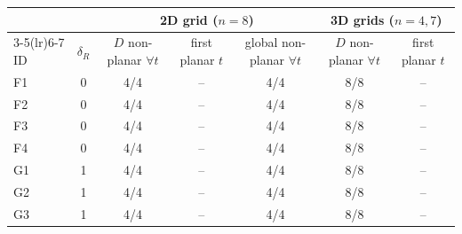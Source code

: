 \begin{tabular}{lcccccc}
\toprule
 & & \multicolumn{3}{c}{2D grid ($n=8$)} & \multicolumn{2}{c}{3D grids ($n=4,7$)}\\
\cmidrule(lr){3-5}\cmidrule(lr){6-7}
ID & $\delta_R$ & $D$ non-planar $\forall t$ & first planar $t$ & global non-planar $\forall t$ & $D$ non-planar $\forall t$ & first planar $t$\\
\midrule
F1 & 0 & 4/4 & -- & 4/4 & 8/8 & --\\
F2 & 0 & 4/4 & -- & 4/4 & 8/8 & --\\
F3 & 0 & 4/4 & -- & 4/4 & 8/8 & --\\
F4 & 0 & 4/4 & -- & 4/4 & 8/8 & --\\
G1 & 1 & 4/4 & -- & 4/4 & 8/8 & --\\
G2 & 1 & 4/4 & -- & 4/4 & 8/8 & --\\
G3 & 1 & 4/4 & -- & 4/4 & 8/8 & --\\
\bottomrule
\end{tabular}
